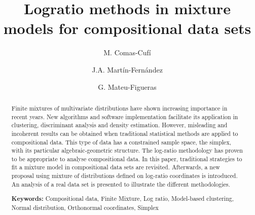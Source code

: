 \documentclass[12pt, a4paper]{article}
\title{Logratio methods in mixture models for compositional data sets}
\author{M. Comas-Cufí \and J.A. Martín-Fernández \and G. Mateu-Figueras}
\begin{document}
\maketitle




\begin{abstract}
Finite mixtures of multivariate distributions have shown increasing importance in recent years. New algorithms and software implementation facilitate its application in clustering, discriminant analysis and density estimation. 
However, misleading and incoherent results can be obtained when traditional statistical methods are applied to compositional data. This type of data has a constrained sample space, the simplex, with its particular algebraic-geometric structure. The log-ratio methodology has proven to be appropriate to analyse compositional data. In this paper, traditional strategies to fit a mixture model in compositional data sets are revisited. Afterwards, a new proposal using mixture of distributions defined on log-ratio coordinates is introduced. An analysis of a real data set is presented to illustrate the different methodologies.

{\bf Keywords:} Compositional data, Finite Mixture, Log ratio, Model-based clustering, Normal distribution, Orthonormal coordinates, Simplex
\end{abstract}



\end{document}

